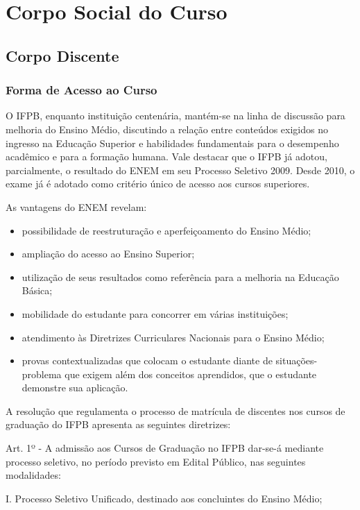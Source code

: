 \newpage
\section{Corpo Social do Curso}

\subsection{Corpo Discente}

\subsubsection{Forma de Acesso ao Curso}

	O IFPB, enquanto instituição centenária, mantém-se na linha de discussão para melhoria do Ensino Médio, discutindo a relação entre conteúdos exigidos no ingresso na Educação Superior e habilidades fundamentais para o desempenho acadêmico e para a formação humana. Vale destacar que o IFPB já adotou, parcialmente, o resultado do ENEM em seu Processo Seletivo 2009. Desde 2010, o exame já é adotado como critério único de acesso aos cursos superiores.

As vantagens do ENEM revelam:
\begin{itemize}
\item possibilidade de reestruturação e aperfeiçoamento do Ensino Médio;
\item ampliação do acesso ao Ensino Superior;
\item utilização de seus resultados como referência para a melhoria na Educação Básica;
\item mobilidade do estudante para concorrer em várias instituições;
\item atendimento às Diretrizes Curriculares Nacionais para o Ensino Médio;
\item provas contextualizadas que colocam o estudante diante de situações-problema que exigem além dos conceitos aprendidos, que o estudante demonstre sua aplicação.
\end{itemize}

 A resolução que regulamenta o processo de matrícula de discentes nos cursos de graduação do IFPB apresenta as seguintes diretrizes:

Art. 1º - A admissão aos Cursos de Graduação no IFPB dar-se-á mediante processo seletivo, no período previsto em Edital Público, nas seguintes modalidades:


I. Processo Seletivo Unificado, destinado aos concluintes do Ensino Médio;

